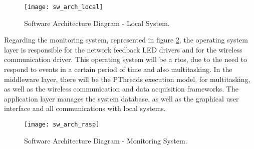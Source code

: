 \begin{figure}[ht]
	\centering
	\texttt{[image: sw\_arch\_local]}
	\caption{Software Architecture Diagram - Local System.}
	\label{fig:sw_arch_local}
\end{figure}

Regarding the monitoring system, represented in figure \ref{fig:sw_arch_rasp}, the operating system layer is responsible for the network feedback LED drivers and for the wireless communication driver. This operating system will be a \ac{rtos}, due to the need to respond to events in a certain period of time and also multitasking. In the middleware layer, there will be the PThreads execution model, for multitasking, as well as the wireless communication and data acquisition frameworks. The application layer manages the system database, as well as the graphical user interface and all communications with local systems.

\begin{figure}[ht]
	\centering
	\texttt{[image: sw\_arch\_rasp]}
	\caption{Software Architecture Diagram - Monitoring System.}
	\label{fig:sw_arch_rasp}
\end{figure}
